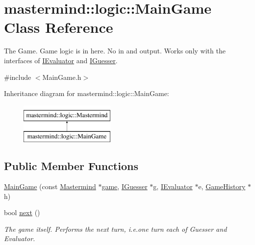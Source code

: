 \hypertarget{classmastermind_1_1logic_1_1_main_game}{}\section{mastermind\+:\+:logic\+:\+:Main\+Game Class Reference}
\label{classmastermind_1_1logic_1_1_main_game}


The Game. Game logic is in here. No in and output. Works only with the interfaces of \hyperlink{classmastermind_1_1logic_1_1_i_evaluator}{I\+Evaluator} and \hyperlink{classmastermind_1_1logic_1_1_i_guesser}{I\+Guesser}.  




{\ttfamily \#include $<$Main\+Game.\+h$>$}

Inheritance diagram for mastermind\+:\+:logic\+:\+:Main\+Game\+:\begin{figure}[H]
\begin{center}
\leavevmode
\includegraphics[height=2.000000cm]{classmastermind_1_1logic_1_1_main_game}
\end{center}
\end{figure}
\subsection*{Public Member Functions}
\begin{DoxyCompactItemize}
\item 
\hyperlink{classmastermind_1_1logic_1_1_main_game_af298f54f55a4803bd5a7a9dec61b3548}{Main\+Game} (const \hyperlink{classmastermind_1_1logic_1_1_mastermind}{Mastermind} $\ast$\hyperlink{classmastermind_1_1logic_1_1_main_game_a063ce840892c07f33091a2e3935365ee}{game}, \hyperlink{classmastermind_1_1logic_1_1_i_guesser}{I\+Guesser} $\ast$g, \hyperlink{classmastermind_1_1logic_1_1_i_evaluator}{I\+Evaluator} $\ast$e, \hyperlink{classmastermind_1_1logic_1_1_game_history}{Game\+History} $\ast$h)
\item 
bool \hyperlink{classmastermind_1_1logic_1_1_main_game_a2b48f18cf8dbd95431d4627b57ea5d01}{next} ()
\begin{DoxyCompactList}\small\item\em The game itself. Performs the next turn, i.\+e.\+one turn each of Guesser and Evaluator. \end{DoxyCompactList}\end{DoxyCompactItemize}
